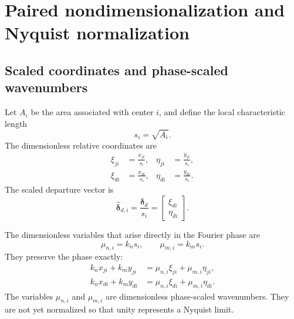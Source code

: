 \documentclass[11pt]{article}
\numberwithin{equation}{section}
\begin{document}
\section{Paired nondimensionalization and Nyquist normalization}
\label{sec:paired-nondimensionalization}

\subsection{Scaled coordinates and phase-scaled wavenumbers}

Let $A_i$ be the area associated with center $i$, and define the local characteristic length
\begin{equation}
    s_i=\sqrt{A_i}.
    \label{eq:local-length-scale}
\end{equation}
The dimensionless relative coordinates are
\begin{subequations}
\label{eq:dimensionless-coordinates}
\begin{align}
    \xi_{ji}&=\frac{x_{ji}}{s_i},
    &
    \eta_{ji}&=\frac{y_{ji}}{s_i},
    \label{eq:dimensionless-node-coordinates}\\
    \xi_{di}&=\frac{x_{di}}{s_i},
    &
    \eta_{di}&=\frac{y_{di}}{s_i}.
    \label{eq:dimensionless-departure-coordinates}
\end{align}
\end{subequations}
The scaled departure vector is
\begin{equation}
    \widehat{\bm{\delta}}_{d,i}
    =
    \frac{\bm{\delta}_d}{s_i}
    =
    \begin{bmatrix}
        \xi_{di}\\[1mm]
        \eta_{di}
    \end{bmatrix}.
    \label{eq:scaled-departure-vector}
\end{equation}

The dimensionless variables that arise directly in the Fourier phase are
\begin{equation}
    \mu_{n,i}=k_ns_i,
    \qquad
    \mu_{m,i}=k_ms_i.
    \label{eq:phase-scaled-wavenumbers}
\end{equation}
They preserve the phase exactly:
\begin{align}
    k_nx_{ji}+k_my_{ji}
    &=
    \mu_{n,i}\xi_{ji}+\mu_{m,i}\eta_{ji},
    \label{eq:node-phase-preservation}\\
    k_nx_{di}+k_my_{di}
    &=
    \mu_{n,i}\xi_{di}+\mu_{m,i}\eta_{di}.
    \label{eq:departure-phase-preservation}
\end{align}
The variables $\mu_{n,i}$ and $\mu_{m,i}$ are dimensionless phase-scaled wavenumbers. They are not yet normalized so that unity represents a Nyquist limit.
\end{document}
